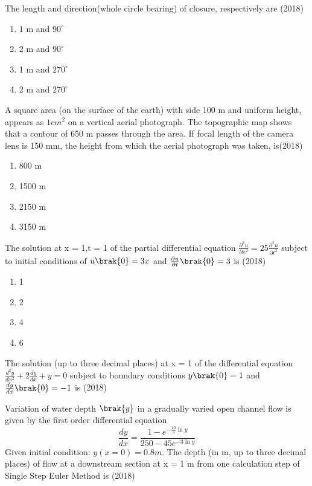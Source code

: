     The length and direction(whole circle bearing) of closure, respectively are \hfill (2018)
    \begin{enumerate}[label=(\Alph*)]
        \item 1 m and $90^{\circ}$
        \item 2 m and $90^{\circ}$
        \item 1 m and $270^{\circ}$
        \item 2 m and $270^{\circ}$
    \end{enumerate}
    \item A square area (on the surface of the earth) with side 100 m and uniform height, appears as
    $1 cm^2$ on a vertical aerial photograph. The topographic map shows that a contour of 650 m
    passes through the area. If focal length of the camera lens is 150 mm, the height from
    which the aerial photograph was taken, is\hfill (2018)
    \begin{enumerate}[label=(\Alph*)]
        \item 800 m 
        \item 1500 m 
        \item 2150 m 
        \item 3150 m 
    \end{enumerate}
    \item The solution at x = 1,t = 1 of the partial differential equation $\frac{\partial ^2 u}{\partial x^2} = 25\frac{\partial^2u}{\partial t^2}$ subject to initial conditions of $u\brak{0} = 3x$ and $\frac{\partial u}{\partial t}\brak{0}=3$ is \hfill (2018)
    \begin{enumerate}[label=(\Alph*)]
        \item 1
        \item 2
        \item 4
        \item 6
    \end{enumerate}
    \item The solution (up to three decimal places) at x = 1 of the differential equation $\frac{d^2y}{dx^2}+2\frac{dy}{dx}+y=0$ subject to boundary conditions $y\brak{0}=1$ and $\frac{dy}{dx}\brak{0} = -1$ is \hfill (2018)
    \item Variation of water depth $\brak{y}$ in a gradually varied open channel flow is given by the first
    order differential equation $$\frac{dy}{dx} = \frac{1-e^{-\frac{10}{3}\ln y}}{250-45e^{-3\ln y}}$$Given initial condition: $y(x = 0) = 0.8 m$. The depth (in m, up to three decimal places) of
    flow at a downstream section at x = 1 m from one calculation step of Single Step Euler Method is \hfill (2018)
     


